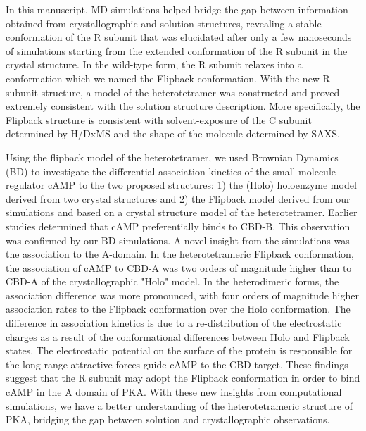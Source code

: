 \documentclass[12pt]{ucsddissertation}
\begin{document}
In this manuscript, MD simulations helped bridge the gap between information obtained from crystallographic and solution structures, revealing a stable conformation of the R subunit that was elucidated after only a few nanoseconds of simulations starting from the extended conformation of the R subunit in the crystal structure. In the wild-type form, the R subunit relaxes into a conformation which we named the Flipback conformation. With the new R subunit structure, a model of the heterotetramer was constructed and proved extremely consistent with the solution structure description. More specifically, the Flipback structure is consistent with solvent-exposure of the C subunit determined by H/DxMS and the shape of the molecule determined by SAXS. 

Using the flipback model of the heterotetramer, we used Brownian Dynamics (BD) to investigate the differential association kinetics of the small-molecule regulator cAMP to the two proposed structures: 1) the (Holo) holoenzyme model derived from two crystal structures and 2) the Flipback model derived from our simulations and based on a crystal structure model of the heterotetramer. Earlier studies determined that cAMP preferentially binds to CBD-B. This observation was confirmed by our BD simulations. A novel insight from the simulations was the association to the A-domain. In the heterotetrameric Flipback conformation, the association of cAMP to CBD-A was two orders of magnitude higher than to CBD-A of the crystallographic "Holo" model. In the heterodimeric forms, the association difference was more pronounced, with four orders of magnitude higher association rates to the Flipback conformation over the Holo conformation. The difference in association kinetics is due to a re-distribution of the electrostatic charges as a result of the conformational differences between Holo and Flipback states. The electrostatic potential on the surface of the protein is responsible for the long-range attractive forces guide cAMP to the CBD target. These findings suggest that the R subunit may adopt the Flipback conformation in order to bind cAMP in the A domain of PKA. With these new insights from computational simulations, we have a better understanding of the heterotetrameric structure of PKA, bridging the gap between solution and crystallographic observations.    \\
\end{document}
